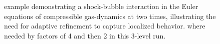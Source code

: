 \begin{figure}[t]
  \begin{center}
    \hfil
  \end{center}
\caption{\amrclaw example demonstrating a
  shock-bubble interaction in the Euler equations of compressible
  gas-dynamics at two times, illustrating the need for adaptive refinement
  to capture localized behavior.  where needed
  by factors of 4 and then 2 in this 3-level run.}
\label{fig:shockbubble}
\end{figure}

